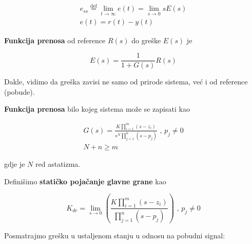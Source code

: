 \documentclass[12pt]{IEEEtran}
\numberwithin{equation}{subsection}
\numberwithin{figure}{section}
\begin{document}
\begin{gather}
    e_{ss} \stackrel{\text{def}}{=} \lim_{t \to \infty}{e(t)} = \lim_{s \to 0}{sE(s)}\\
    e(t) = r(t) - y(t)
\end{gather}

\textbf{Funkcija prenosa} od reference $R(s)$ do gre\v{s}ke $E(s)$ je

\begin{equation}
    E(s) = \frac{1}{1 + G(s)}R(s)
\end{equation}

Dakle, vidimo da gre\v{s}ka zavisi ne samo od prirode sistema, ve\'{c} i od
reference (pobude).

\textbf{Funkcija prenosa} bilo kojeg sistema mo\v{z}e se zapisati kao

\begin{gather}
    G(s) = \frac{K\prod\limits_{i=1}^{m}{(s - z_{i})}}{s^{N}\prod\limits_{j=1}^{n}{(s - p_{j})}} \text{ , } p_{j} \neq 0\\
    N + n \geq m
\end{gather}

gdje je $N$ red astatizma.

Defini\v{s}imo \textbf{stati\v{c}ko poja\v{c}anje glavne grane} kao

\begin{equation}
    K_{dc} = \lim_{s \to 0}{\left(\frac{K\prod\limits_{i=1}^{m}{(s - z_{i})}}{\prod\limits_{j=1}^{n}{(s - p_{j})}}\right)} \text{ , } p_{j} \neq 0
\end{equation}

Posmatrajmo gre\v{s}ku u ustaljenom stanju u odnosu na pobudni signal:
\end{document}
